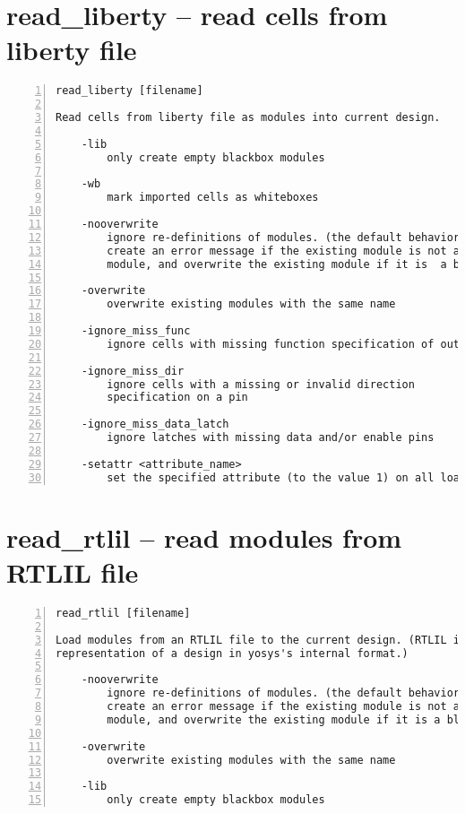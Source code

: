 \section{read\_liberty -- read cells from liberty file}
\label{cmd:read_liberty}
\begin{lstlisting}[numbers=left,frame=single]
    read_liberty [filename]

Read cells from liberty file as modules into current design.

    -lib
        only create empty blackbox modules

    -wb
        mark imported cells as whiteboxes

    -nooverwrite
        ignore re-definitions of modules. (the default behavior is to
        create an error message if the existing module is not a blackbox
        module, and overwrite the existing module if it is  a blackbox module.)

    -overwrite
        overwrite existing modules with the same name

    -ignore_miss_func
        ignore cells with missing function specification of outputs

    -ignore_miss_dir
        ignore cells with a missing or invalid direction
        specification on a pin

    -ignore_miss_data_latch
        ignore latches with missing data and/or enable pins

    -setattr <attribute_name>
        set the specified attribute (to the value 1) on all loaded modules
\end{lstlisting}

\section{read\_rtlil -- read modules from RTLIL file}
\label{cmd:read_rtlil}
\begin{lstlisting}[numbers=left,frame=single]
    read_rtlil [filename]

Load modules from an RTLIL file to the current design. (RTLIL is a text
representation of a design in yosys's internal format.)

    -nooverwrite
        ignore re-definitions of modules. (the default behavior is to
        create an error message if the existing module is not a blackbox
        module, and overwrite the existing module if it is a blackbox module.)

    -overwrite
        overwrite existing modules with the same name

    -lib
        only create empty blackbox modules
\end{lstlisting}

